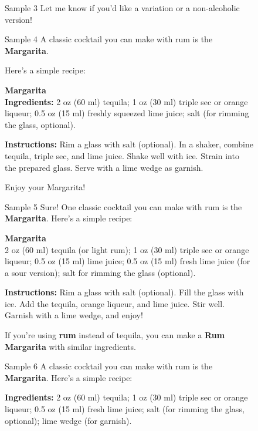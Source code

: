 \begin{figure}[t]
\begin{minipage}[t]{0.32\linewidth}
\begin{respbox}{Sample 3}
Let me know if you'd like a variation or a non-alcoholic version!
\end{respbox}
\end{minipage}

\vspace{6pt}

\begin{minipage}[t]{0.32\linewidth}
\begin{respbox}{Sample 4}
A classic cocktail you can make with rum is the \textbf{Margarita}.

Here's a simple recipe:

\textbf{Margarita} \\
\textbf{Ingredients:} 2 oz (60 ml) tequila; 1 oz (30 ml) triple sec or orange liqueur; 0.5 oz (15 ml) freshly squeezed lime juice; salt (for rimming the glass, optional).

\textbf{Instructions:} Rim a glass with salt (optional). In a shaker, combine tequila, triple sec, and lime juice. Shake well with ice. Strain into the prepared glass. Serve with a lime wedge as garnish.

Enjoy your Margarita!
\end{respbox}
\end{minipage}\hfill%
\begin{minipage}[t]{0.32\linewidth}
\begin{respbox}{Sample 5}
Sure! One classic cocktail you can make with rum is the \textbf{Margarita}. Here's a simple recipe:

\textbf{Margarita} \\
2 oz (60 ml) tequila (or light rum); 1 oz (30 ml) triple sec or orange liqueur; 0.5 oz (15 ml) lime juice; 0.5 oz (15 ml) fresh lime juice (for a sour version); salt for rimming the glass (optional).

\textbf{Instructions:} Rim a glass with salt (optional). Fill the glass with ice. Add the tequila, orange liqueur, and lime juice. Stir well. Garnish with a lime wedge, and enjoy!

If you're using \textbf{rum} instead of tequila, you can make a \textbf{Rum Margarita} with similar ingredients.
\end{respbox}
\end{minipage}\hfill%
\begin{minipage}[t]{0.32\linewidth}
\begin{respbox}{Sample 6}
A classic cocktail you can make with rum is the \textbf{Margarita}. Here's a simple recipe:

\textbf{Ingredients:} 2 oz (60 ml) tequila; 1 oz (30 ml) triple sec or orange liqueur; 0.5 oz (15 ml) fresh lime juice; salt (for rimming the glass, optional); lime wedge (for garnish).


\end{respbox}
\end{minipage}
\end{figure}
